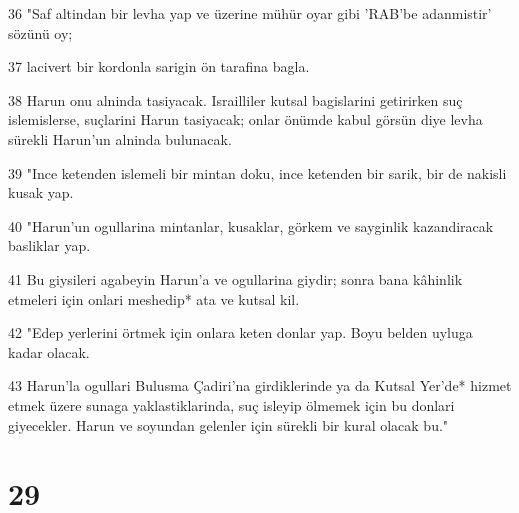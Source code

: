 \par 36 "Saf altindan bir levha yap ve üzerine mühür oyar gibi 'RAB'be adanmistir' sözünü oy;
\par 37 lacivert bir kordonla sarigin ön tarafina bagla.
\par 38 Harun onu alninda tasiyacak. Israilliler kutsal bagislarini getirirken suç islemislerse, suçlarini Harun tasiyacak; onlar önümde kabul görsün diye levha sürekli Harun'un alninda bulunacak.
\par 39 "Ince ketenden islemeli bir mintan doku, ince ketenden bir sarik, bir de nakisli kusak yap.
\par 40 "Harun'un ogullarina mintanlar, kusaklar, görkem ve sayginlik kazandiracak basliklar yap.
\par 41 Bu giysileri agabeyin Harun'a ve ogullarina giydir; sonra bana kâhinlik etmeleri için onlari meshedip* ata ve kutsal kil.
\par 42 "Edep yerlerini örtmek için onlara keten donlar yap. Boyu belden uyluga kadar olacak.
\par 43 Harun'la ogullari Bulusma Çadiri'na girdiklerinde ya da Kutsal Yer'de* hizmet etmek üzere sunaga yaklastiklarinda, suç isleyip ölmemek için bu donlari giyecekler. Harun ve soyundan gelenler için sürekli bir kural olacak bu."

\chapter{29}

